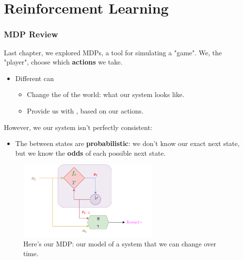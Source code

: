 \setcounter{chapter}{13-1} %

\chapter{Reinforcement Learning}

    \subsection{MDP Review}

        Last chapter, we explored MDPs, a tool for simulating a "game". We, the "player", choose which \textbf{actions} we take.
        
        \begin{itemize}
            \item Different  can
                \begin{itemize}
                    \item Change the  of the world: what our system looks like.
                    \item Provide us with , based on our actions.
                \end{itemize}
        \end{itemize}

        However, we our system isn't perfectly consistent:
        
        \begin{itemize}
            \item The  between states are \textbf{probabilistic}: we don't know our exact next state, but we know the \textbf{odds} of each possible next state.
        \end{itemize}

        \begin{figure}[H]
            \centering
            \includegraphics[width=70mm,scale=0.5]{images/mdp_images/mdp_transparent.png}
            
            \caption*{Here's our MDP: our model of a system that we can change over time.}
        \end{figure}

